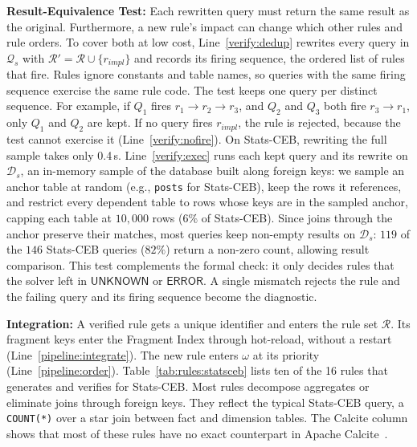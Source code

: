 \textbf{Result-Equivalence Test:}
Each rewritten query must return the same result as the original.
Furthermore, a new rule's impact can change which other rules and rule orders.
To cover both at low cost, Line~\ref{verify:dedup} rewrites every query in $\mathcal{Q}_s$ with $\mathcal{R}' = \mathcal{R} \cup \{r_{\mathit{impl}}\}$ and records its firing sequence, the ordered list of rules that fire.
Rules ignore constants and table names, so queries with the same firing sequence exercise the same rule code.
The test keeps one query per distinct sequence.
For example, if $Q_1$ fires $r_1 \to r_2 \to r_3$, and $Q_2$ and $Q_3$ both fire $r_3 \to r_1$, only $Q_1$ and $Q_2$ are kept.
If no query fires $r_{\mathit{impl}}$, the rule is rejected, because the test cannot exercise it (Line~\ref{verify:nofire}).
On Stats-CEB, rewriting the full sample takes only 0.4\,s.
Line~\ref{verify:exec} runs each kept query and its rewrite on $\mathcal{D}_s$, an in-memory sample of the database built along foreign keys: we sample an anchor table at random (e.g., \texttt{posts} for Stats-CEB), keep the rows it references, and restrict every dependent table to rows whose keys are in the sampled anchor, capping each table at $10{,}000$ rows ($6\%$ of Stats-CEB). Since joins through the anchor preserve their matches, most queries keep non-empty results on $\mathcal{D}_s$: $119$ of the $146$ Stats-CEB queries ($82\%$) return a non-zero count, allowing result comparison. This test complements the formal check: it only decides rules that the solver left in $\mathsf{UNKNOWN}$ or $\mathsf{ERROR}$.
A single mismatch rejects the rule and the failing query and its firing sequence become the diagnostic.\shorten

\textbf{Integration:}
A verified rule gets a unique identifier and enters the rule set $\mathcal{R}$.
Its fragment keys enter the Fragment Index through hot-reload, without a restart (Line~\ref{pipeline:integrate}).
The new rule enters $\omega$ at its priority (Line~\ref{pipeline:order}).
%
Table~\ref{tab:rules:statsceb} lists ten of the 16 rules that {\sys} generates and verifies for Stats-CEB.
Most rules decompose aggregates or eliminate joins through foreign keys.
They reflect the typical Stats-CEB query, a \texttt{COUNT(*)} over a star join between fact and dimension tables.
The Calcite column shows that most of these rules have no exact counterpart in Apache Calcite~\cite{Calcite}.
